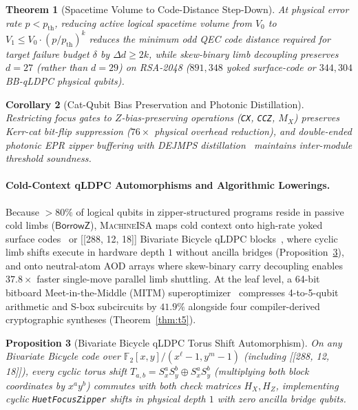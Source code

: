 \documentclass[acmsmall,screen,anonymous]{acmart}
\DeclareRobustCommand{\_}{\ifmmode\text{\char95}\else\char95\penalty0\relax\fi}
\theoremstyle{plain}
\newtheorem{theorem}{Theorem}[section]
\newtheorem{proposition}[theorem]{Proposition}
\newtheorem{corollary}[theorem]{Corollary}
\newcommand{\MachineISA}{\textsc{MachineISA}}
\newcommand{\CapBorrowZ}{\ensuremath{\mathsf{BorrowZ}}}
\begin{document}
\begin{theorem}[Spacetime Volume to Code-Distance Step-Down]
\label{thm:t4}
At physical error rate $p < p_{\mathrm{th}}$, reducing active logical spacetime volume from $V_0$ to $V_1 \le V_0 \cdot (p / p_{\mathrm{th}})^{k}$ reduces the minimum odd QEC code distance required for target failure budget $\delta$ by $\Delta d \ge 2k$, while skew-binary limb decoupling preserves $d = 27$ (rather than $d = 29$) on RSA-2048 ($891{,}348$ yoked surface-code or $344{,}304$ BB-qLDPC physical qubits).
\end{theorem}

\begin{corollary}[Cat-Qubit Bias Preservation and Photonic Distillation]
\label{cor:c1}
Restricting focus gates to $Z$-bias-preserving operations (\texttt{CX}, \texttt{CCZ}, $M_X$) preserves Kerr-cat bit-flip suppression ($76\times$ physical overhead reduction), and double-ended photonic EPR zipper buffering with DEJMPS distillation~\cite{deutsch1996,renes2016complete} maintains inter-module threshold soundness.
\end{corollary}

\paragraph{Cold-Context qLDPC Automorphisms and Algorithmic Lowerings.}
Because $>80\%$ of logical qubits in zipper-structured programs reside in passive cold limbs ($\CapBorrowZ$), \MachineISA{} maps cold context onto high-rate yoked surface codes~\cite{gidney2025} or [[288, 12, 18]] Bivariate Bicycle qLDPC blocks~\cite{bravyi2024}, where cyclic limb shifts execute in hardware depth $1$ without ancilla bridges (Proposition~\ref{prop:p3}), and onto neutral-atom AOD arrays where skew-binary carry decoupling enables $37.8\times$ faster single-move parallel limb shuttling. At the leaf level, a 64-bit bitboard Meet-in-the-Middle (MITM) superoptimizer~\cite{amy2014} compresses 4-to-5-qubit arithmetic and S-box subcircuits by $41.9\%$ alongside four compiler-derived cryptographic syntheses (Theorem~\ref{thm:t5}).

\begin{proposition}[Bivariate Bicycle qLDPC Torus Shift Automorphism]
\label{prop:p3}
On any Bivariate Bicycle code over $\mathbb{F}_2[x,y]/(x^\ell - 1, y^m - 1)$ (including [[288, 12, 18]]), every cyclic torus shift $T_{a,b} = S_x^a S_y^b \oplus S_x^a S_y^b$ (multiplying both block coordinates by $x^a y^b$) commutes with both check matrices $H_X, H_Z$, implementing cyclic \texttt{HuetFocusZipper} shifts in physical depth $1$ with zero ancilla bridge qubits.
\end{proposition}
\end{document}
